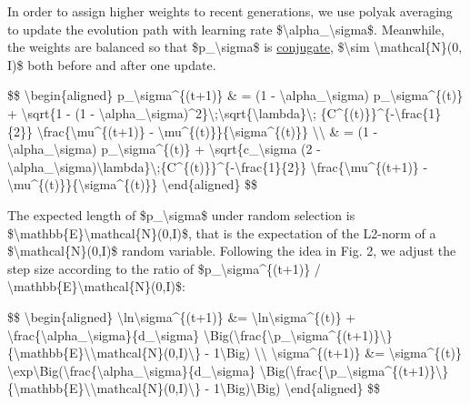 In order to assign higher weights to recent generations, we use polyak averaging to update the evolution path with learning rate \$\textbackslash alpha\_\textbackslash sigma\$. Meanwhile, the weights are balanced so that \$p\_\textbackslash sigma\$ is \href{https://en.wikipedia.org/wiki/Conjugate_prior}{conjugate}, \$\textbackslash sim \textbackslash mathcal\{N\}(0, I)\$ both before and after one update.

\$\$ \textbackslash begin\{aligned\} p\_\textbackslash sigma\^{}\{(t+1)\} \& = (1 - \textbackslash alpha\_\textbackslash sigma) p\_\textbackslash sigma\^{}\{(t)\} + \textbackslash sqrt\{1 - (1 - \textbackslash alpha\_\textbackslash sigma)\^{}2\}\textbackslash;\textbackslash sqrt\{\textbackslash lambda\}\textbackslash; \{C\^{}\{(t)\}\}\^{}\{-\textbackslash frac\{1\}\{2\}\} \textbackslash frac\{\textbackslash mu\^{}\{(t+1)\} - \textbackslash mu\^{}\{(t)\}\}\{\textbackslash sigma\^{}\{(t)\}\} \textbackslash\textbackslash{} \& = (1 - \textbackslash alpha\_\textbackslash sigma) p\_\textbackslash sigma\^{}\{(t)\} + \textbackslash sqrt\{c\_\textbackslash sigma (2 - \textbackslash alpha\_\textbackslash sigma)\textbackslash lambda\}\textbackslash;\{C\^{}\{(t)\}\}\^{}\{-\textbackslash frac\{1\}\{2\}\} \textbackslash frac\{\textbackslash mu\^{}\{(t+1)\} - \textbackslash mu\^{}\{(t)\}\}\{\textbackslash sigma\^{}\{(t)\}\} \textbackslash end\{aligned\} \$\$

The expected length of \$p\_\textbackslash sigma\$ under random selection is \$\textbackslash mathbb\{E\}\textbar\textbackslash mathcal\{N\}(0,I)\textbar\$, that is the expectation of the L2-norm of a \$\textbackslash mathcal\{N\}(0,I)\$ random variable. Following the idea in Fig. 2, we adjust the step size according to the ratio of \$\textbar p\_\textbackslash sigma\^{}\{(t+1)\}\textbar{} / \textbackslash mathbb\{E\}\textbar\textbackslash mathcal\{N\}(0,I)\textbar\$:

\$\$ \textbackslash begin\{aligned\} \textbackslash ln\textbackslash sigma\^{}\{(t+1)\} \&= \textbackslash ln\textbackslash sigma\^{}\{(t)\} + \textbackslash frac\{\textbackslash alpha\_\textbackslash sigma\}\{d\_\textbackslash sigma\} \textbackslash Big(\textbackslash frac\{\textbackslash\textbar p\_\textbackslash sigma\^{}\{(t+1)\}\textbackslash\textbar\}\{\textbackslash mathbb\{E\}\textbackslash\textbar\textbackslash mathcal\{N\}(0,I)\textbackslash\textbar\} - 1\textbackslash Big) \textbackslash\textbackslash{} \textbackslash sigma\^{}\{(t+1)\} \&= \textbackslash sigma\^{}\{(t)\} \textbackslash exp\textbackslash Big(\textbackslash frac\{\textbackslash alpha\_\textbackslash sigma\}\{d\_\textbackslash sigma\} \textbackslash Big(\textbackslash frac\{\textbackslash\textbar p\_\textbackslash sigma\^{}\{(t+1)\}\textbackslash\textbar\}\{\textbackslash mathbb\{E\}\textbackslash\textbar\textbackslash mathcal\{N\}(0,I)\textbackslash\textbar\} - 1\textbackslash Big)\textbackslash Big) \textbackslash end\{aligned\} \$\$

